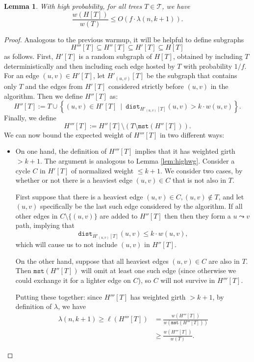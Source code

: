 \documentclass{article}
\theoremstyle{plain}
\newtheorem{lemma}[theorem]{Lemma}
\theoremstyle{definition}
\newcommand{\dist}{\texttt{dist}}
\newcommand{\mst}{\texttt{mst}}
\begin{document}
\begin{lemma} \label{lem:polyhostbound}
With high probability, for all trees $T \in \mathcal{T}$, we have
$$\frac{w(H[T])}{w(T)} \le O\left(f \cdot \lambda(n, k+1)\right).$$
\end{lemma}
\begin{proof}
Analogous to the previous warmup, it will be helpful to define subgraphs $$H'''[T] \subseteq H''[T] \subseteq H'[T] \subseteq H[T]$$
as follows.
First, $H'[T]$ is a random subgraph of $H[T]$, obtained by including $T$ deterministically and then including each edge hosted by $T$ with probability $1/f$.
For an edge $(u, v) \in H'[T]$, let $H'_{(u, v)}[T]$ be the subgraph that contains only $T$ and the edges from $H'[T]$ considered strictly before $(u, v)$ in the algorithm.
Then we define $H''[T]$ as:
$$H''[T] := T \cup \left\{ (u, v) \in H'[T] \ \mid \ \dist_{H'_{(u, v)}[T]}(u, v) > k \cdot w(u, v)\right\}.$$
Finally, we define
$$H'''[T] := H''[T] \setminus \left( T \setminus \mst(H''[T])\right).$$
We can now bound the expected weight of $H'''[T]$ in two different ways:
\begin{itemize}
\item On one hand, the definition of $H'''[T]$ implies that it has weighted girth $>k+1$.
The argument is analogous to Lemma \ref{lem:highwg}.
Consider a cycle $C$ in $H'[T]$ of normalized weight $\le k+1$.
We consider two cases, by whether or not there is a heaviest edge $(u, v) \in C$ that is not also in $T$.

First suppose that there is a heaviest edge $(u, v) \in C, (u, v) \notin T$, and let $(u, v)$ specifically be the last such edge considered by the algorithm.
If all other edges in $C \setminus \{(u, v)\}$ are added to $H''[T]$ then then they form a $u \leadsto v$ path, implying that
$$\dist_{H'_{(u, v)}[T]}(u, v) \le k \cdot w(u, v),$$
which will cause us to not include $(u, v)$ in $H''[T]$.

On the other hand, suppose that all heaviest edges $(u, v) \in C$ are also in $T$.
Then $\mst(H''[T])$ will omit at least one such edge (since otherwise we could exchange it for a lighter edge on $C$), so $C$ will not survive in $H'''[T]$.

Putting these together: since $H'''[T]$ has weighted girth $>k+1$, by definition of $\lambda$, we have
\begin{align*}
\lambda(n, k+1) \ge \ell(H'''[T]) &= \frac{w(H'''[T])}{w(\mst(H'''[T]))}\\
&\ge \frac{w(H'''[T])}{w(T)}.
\end{align*}


\end{itemize}
\end{proof}
\end{document}
